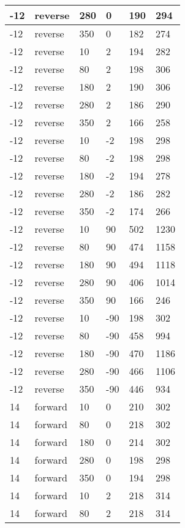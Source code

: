 \begin{table}
\begin{center}
\begin{tabular}{|l|l|l|l|l|l|}
			-12 & reverse & 280 & 0 & 190 & 294 \\
			\hline
			-12 & reverse & 350 & 0 & 182 & 274 \\
			\hline
			-12 & reverse & 10 & 2 & 194 & 282 \\
			\hline
			-12 & reverse & 80 & 2 & 198 & 306 \\
			\hline
			-12 & reverse & 180 & 2 & 190 & 306 \\
			\hline
			-12 & reverse & 280 & 2 & 186 & 290 \\
			\hline
			-12 & reverse & 350 & 2 & 166 & 258 \\
			\hline
			-12 & reverse & 10 & -2 & 198 & 298 \\
			\hline
			-12 & reverse & 80 & -2 & 198 & 298 \\
			\hline
			-12 & reverse & 180 & -2 & 194 & 278 \\
			\hline
			-12 & reverse & 280 & -2 & 186 & 282 \\
			\hline
			-12 & reverse & 350 & -2 & 174 & 266 \\
			\hline
			-12 & reverse & 10 & 90 & 502 & 1230 \\
			\hline
			-12 & reverse & 80 & 90 & 474 & 1158 \\
			\hline
			-12 & reverse & 180 & 90 & 494 & 1118 \\
			\hline
			-12 & reverse & 280 & 90 & 406 & 1014 \\
			\hline
			-12 & reverse & 350 & 90 & 166 & 246 \\
			\hline
			-12 & reverse & 10 & -90 & 198 & 302 \\
			\hline
			-12 & reverse & 80 & -90 & 458 & 994 \\
			\hline
			-12 & reverse & 180 & -90 & 470 & 1186 \\
			\hline
			-12 & reverse & 280 & -90 & 466 & 1106 \\
			\hline
			-12 & reverse & 350 & -90 & 446 & 934 \\
			\hline
			14 & forward & 10 & 0 & 210 & 302 \\
			\hline
			14 & forward & 80 & 0 & 218 & 302 \\
			\hline
			14 & forward & 180 & 0 & 214 & 302 \\
			\hline
			14 & forward & 280 & 0 & 198 & 298 \\
			\hline
			14 & forward & 350 & 0 & 194 & 298 \\
			\hline
			14 & forward & 10 & 2 & 218 & 314 \\
			\hline
			14 & forward & 80 & 2 & 218 & 314 \\

\end{tabular}
\end{center}
\end{table}
